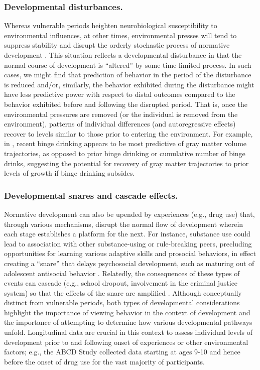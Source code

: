 \documentclass[
  number,
  preprint,
  3p,
  twocolumn]{elsarticle}
\begin{document}
\hypertarget{developmental-disturbances.}{%
\subsubsection{Developmental
disturbances.}\label{developmental-disturbances.}}

Whereas vulnerable periods heighten neurobiological susceptibility to
environmental influences, at other times, environmental presses will
tend to suppress stability and disrupt the orderly stochastic process of
normative development \citep[e.g.,][]{schulenberg2019}. This situation
reflects a developmental disturbance in that the normal course of
development is ``altered'' by some time-limited process. In such cases,
we might find that prediction of behavior in the period of the
disturbance is reduced and/or, similarly, the behavior exhibited during
the disturbance might have less predictive power with respect to distal
outcomes compared to the behavior exhibited before and following the
disrupted period. That is, once the environmental pressures are removed
(or the individual is removed from the environment), patterns of
individual differences (and autoregressive effects) recover to levels
similar to those prior to entering the environment. For example, in
\citep{infante2022}, recent binge drinking appears to be most predictive
of gray matter volume trajectories, as opposed to prior binge drinking
or cumulative number of binge drinks, suggesting the potential for
recovery of gray matter trajectories to prior levels of growth if binge
drinking subsides.

\hypertarget{developmental-snares-and-cascade-effects.}{%
\subsubsection{Developmental snares and cascade
effects.}\label{developmental-snares-and-cascade-effects.}}

Normative development can also be upended by experiences (e.g., drug
use) that, through various mechanisms, disrupt the normal flow of
development wherein each stage establishes a platform for the next. For
instance, substance use could lead to association with other
substance-using or rule-breaking peers, precluding opportunities for
learning various adaptive skills and prosocial behaviors, in effect
creating a ``snare'' that delays psychosocial development, such as
maturing out of adolescent antisocial behavior \citep{moffitt2015}.
Relatedly, the consequences of these types of events can cascade (e.g.,
school dropout, involvement in the criminal justice system) so that the
effects of the snare are amplified
\citep[e.g.,][]{masten2005, rogosch2010}. Although conceptually distinct
from vulnerable periods, both types of developmental considerations
highlight the importance of viewing behavior in the context of
development and the importance of attempting to determine how various
developmental pathways unfold. Longitudinal data are crucial in this
context to assess individual levels of development prior to and
following onset of experiences or other environmental factors; e.g., the
ABCD Study collected data starting at ages 9-10 and hence before the
onset of drug use for the vast majority of participants.
\end{document}
